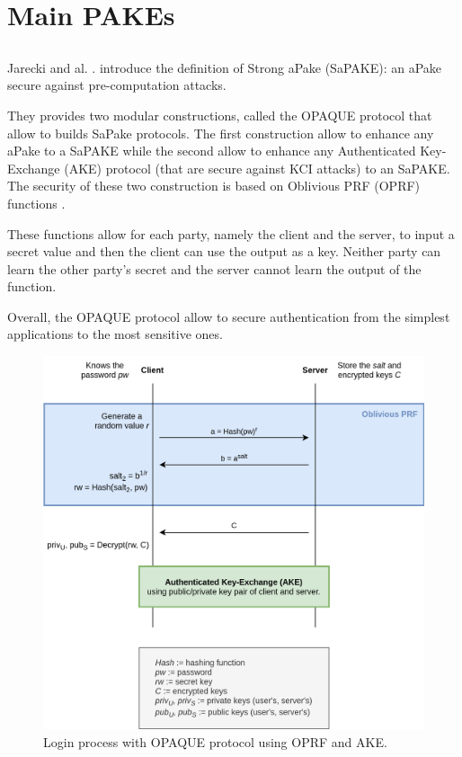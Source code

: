 \documentclass[../report.tex]{subfiles}
\begin{document}
\section{Main PAKEs}

\subsection{}


\paragraph{}
Jarecki and al. \cite{}. introduce the definition of Strong aPake (SaPAKE): an aPake secure against pre-computation attacks.

They provides two modular constructions, called the OPAQUE protocol that allow to builds SaPake protocols. The first construction allow to enhance any aPake to a SaPAKE while the second allow to enhance any Authenticated Key-Exchange (AKE) protocol (that are secure against KCI attacks) to an SaPAKE.
The security of these two construction is based on Oblivious PRF (OPRF) functions \cite{}.

These functions allow for each party, namely the client and the server, to input a secret value and then the client can use the output as a key. Neither party can learn the other party's secret and the server cannot learn the output of the function.

Overall, the OPAQUE protocol allow to secure authentication from the simplest applications to the most sensitive ones.


\begin{figure}[h]
 \centering
 \includegraphics[width=\textwidth]{OPAQUE.png}
 \caption{Login process with OPAQUE protocol using OPRF and AKE.}
 \label{fig:OPAQUE_AKE}
\end{figure}
\end{document}
